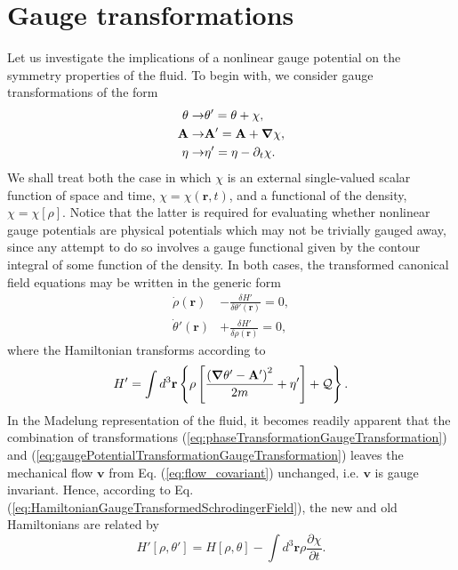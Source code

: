 \documentclass[twocolumn, nofootinbib, nobibnotes, amsmath,amssymb,aps, pra, floatfix]{revtex4-1}
\renewcommand{\v}[1]{\ensuremath{\mathbf{#1}}} %
\newcommand{\gv}[1]{\ensuremath{\mbox{\boldmath$ #1 $}}} %
\newcommand{\pd}[2]{\frac{\partial #1}{\partial #2}} %
\newcommand{\grad}[1]{\gv{\nabla} #1} %
\begin{document}
\section{\label{sec:gauge}Gauge transformations}
Let us investigate the implications of a nonlinear gauge potential on the symmetry properties of the fluid.
To begin with, we consider gauge transformations of the form
\begin{align}
	\theta\rightarrow&\theta'=\theta+\chi, \label{eq:phaseTransformationGaugeTransformation} \\
	\v{A}\rightarrow&\v{A}'=\v{A}+\grad{\chi}, \label{eq:gaugePotentialTransformationGaugeTransformation}\\
    \eta\rightarrow&\eta'=\eta-\partial_t\chi. \label{eq:scalarPotentialTransformationGaugeTransformation}
\end{align}
We shall treat both the case in which $\chi$ is an external single-valued scalar function of space and time, $\chi=\chi\left(\v{r}, t\right)$, and a functional of the density, $\chi=\chi\left[\rho\right]$. 
Notice that the latter is required for evaluating whether nonlinear gauge potentials are physical potentials which may not be trivially gauged away, since any attempt to do so involves a gauge functional given by the contour integral of some function of the density. 
In both cases, the transformed canonical field equations may be written in the generic form 
\begin{align}
  \dot{\rho}\left( \v{r} \right)&-\frac{\delta H'}{\delta\theta'\left( \v{r} \right)}=0, \label{eq:canonicalFieldEquationRhoDotGaugeTransformed}\\
  \dot{\theta}'\left( \v{r} \right)&+\frac{\delta H'}{\delta\rho\left( \v{r} \right)}=0, \label{eq:canonicalFieldEquationThetaDotGaugeTransformed}
\end{align}
where the Hamiltonian transforms according to 
\begin{equation}
    H'=\int d^3\v{r}\left\{ \rho\left[ \frac{\left( \grad{\theta}'-\v{A}' \right)^2}{2m}+\eta' \right]+\mathcal{Q} \right\}.
  \label{eq:HamiltonianGaugeTransformedSchrodingerField}
\end{equation}
In the Madelung representation of the fluid, it becomes readily apparent that the combination of transformations (\ref{eq:phaseTransformationGaugeTransformation}) and (\ref{eq:gaugePotentialTransformationGaugeTransformation}) leaves the mechanical flow $\v{v}$ from Eq. (\ref{eq:flow_covariant}) unchanged, i.e. $\v{v}$ is gauge invariant.
Hence, according to Eq. (\ref{eq:HamiltonianGaugeTransformedSchrodingerField}), the new and old Hamiltonians are related by
\begin{equation}
  H'\left[ \rho,\theta' \right]=H\left[ \rho,\theta \right]-\int d^3\v{r}\rho\pd{\chi}{t}.
  \label{eq:HamiltonianRelationshipGaugeTransformation}
\end{equation}
\end{document}
